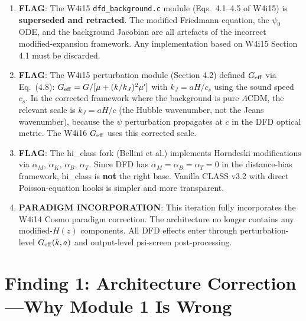 \documentclass[11pt]{article}
\theoremstyle{definition}
\theoremstyle{remark}
\newcommand{\Geff}{G_{\rm eff}}
\newcommand{\LCDM}{$\Lambda$CDM}
\begin{document}
\begin{tcolorbox}[colback=red!5!white, colframe=red!60!black,
  title=\textbf{INCONSISTENCIES AND FLAGS}]
\begin{enumerate}[nosep]
\item \textbf{FLAG}: The W4i15 \texttt{dfd\_background.c} module
  (Eqs.~4.1--4.5 of W4i15) is \textbf{superseded and retracted}.
  The modified Friedmann equation, the $\psi_0$ ODE, and the background
  Jacobian are all artefacts of the incorrect modified-expansion framework.
  Any implementation based on W4i15 Section 4.1 must be discarded.

\item \textbf{FLAG}: The W4i15 perturbation module (Section 4.2)
  defined $\Geff$ via Eq.~(4.8): $\Geff = G/[\mu + (k/k_J)^2 \mu']$
  with $k_J = aH/c_s$ using the sound speed $c_s$. In the corrected
  framework where the background is pure \LCDM, the relevant scale is
  $k_J = aH/c$ (the Hubble wavenumber, not the Jeans wavenumber), because
  the $\psi$ perturbation propagates at $c$ in the DFD optical metric.
  The W4i16 $\Geff$ uses this corrected scale.

\item \textbf{FLAG}: The hi\_class fork (Bellini et al.) implements
  Horndeski modifications via $\alpha_M$, $\alpha_K$, $\alpha_B$,
  $\alpha_T$. Since DFD has $\alpha_M = \alpha_B = \alpha_T = 0$ in the
  distance-bias framework, hi\_class is \textbf{not} the right base.
  Vanilla CLASS v3.2 with direct Poisson-equation hooks is simpler and
  more transparent.

\item \textbf{PARADIGM INCORPORATION}: This iteration fully incorporates
  the W4i14 Cosmo paradigm correction. The architecture no longer contains
  any modified-$H(z)$ components. All DFD effects enter through
  perturbation-level $\Geff(k,a)$ and output-level psi-screen
  post-processing.
\end{enumerate}
\end{tcolorbox}

\newpage

\section{Finding 1: Architecture Correction---Why Module 1 Is Wrong}
\label{sec:arch-correction}
\end{document}
